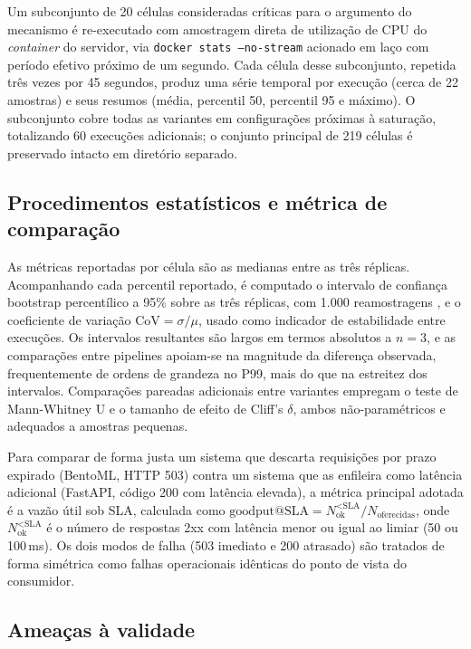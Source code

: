 Um subconjunto de 20 células consideradas críticas para o argumento do
mecanismo é re-executado com amostragem direta de utilização de CPU do
\textit{container} do servidor, via \texttt{docker stats --no-stream}
acionado em laço com período efetivo próximo de um segundo. Cada célula
desse subconjunto, repetida três vezes por 45 segundos, produz uma série
temporal por execução (cerca de 22 amostras) e seus resumos (média,
percentil 50, percentil 95 e máximo). O subconjunto cobre todas as
variantes em configurações próximas à saturação, totalizando 60 execuções
adicionais; o conjunto principal de 219 células é preservado intacto em
diretório separado.

\subsection{Procedimentos estatísticos e métrica de comparação}

As métricas reportadas por célula são as medianas entre as três réplicas.
Acompanhando cada percentil reportado, é computado o intervalo de
confiança bootstrap percentílico a 95\% sobre as três réplicas, com 1.000
reamostragens \cite{efron1979}, e o coeficiente de variação
$\text{CoV} = \sigma/\mu$, usado como indicador de estabilidade entre
execuções. Os intervalos resultantes são largos em termos absolutos a
$n = 3$, e as comparações entre pipelines apoiam-se na magnitude da
diferença observada, frequentemente de ordens de grandeza no P99, mais do
que na estreitez dos intervalos. Comparações pareadas adicionais entre
variantes empregam o teste de Mann-Whitney U e o tamanho de efeito de
Cliff's $\delta$, ambos não-paramétricos e adequados a amostras pequenas.

Para comparar de forma justa um sistema que descarta requisições por prazo
expirado (BentoML, HTTP 503) contra um sistema que as enfileira como
latência adicional (FastAPI, código 200 com latência elevada), a métrica
principal adotada é a vazão útil sob SLA, calculada como
$\text{goodput@SLA} = N_{\text{ok}}^{<\text{SLA}} / N_{\text{oferecidas}}$,
onde $N_{\text{ok}}^{<\text{SLA}}$ é o número de respostas 2xx com latência
menor ou igual ao limiar (50 ou 100\,ms). Os dois modos de falha (503
imediato e 200 atrasado) são tratados de forma simétrica como falhas
operacionais idênticas do ponto de vista do consumidor.

\subsection{Ameaças à validade}

